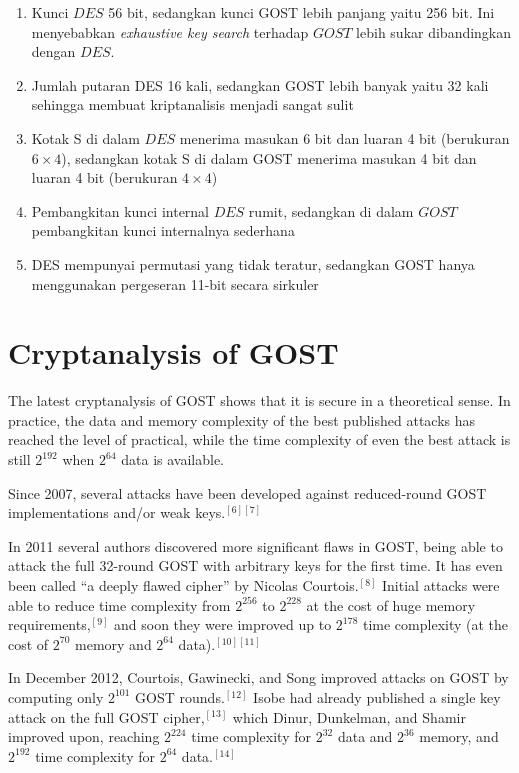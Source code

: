 \documentclass{article}
\begin{document}
\begin{enumerate}
    \item Kunci $DES$ 56 bit, sedangkan kunci GOST lebih panjang yaitu 256 bit. Ini menyebabkan \textit{exhaustive key search} terhadap $GOST$ lebih sukar dibandingkan dengan $DES$.
    \item Jumlah putaran DES 16 kali, sedangkan GOST lebih banyak yaitu 32 kali sehingga membuat kriptanalisis menjadi sangat sulit
    \item Kotak S di dalam $DES$ menerima masukan 6 bit dan luaran 4 bit (berukuran $6 \times 4$), sedangkan kotak S di dalam GOST menerima masukan 4 bit dan luaran 4 bit (berukuran $4 \times 4$)
    \item Pembangkitan kunci internal $DES$ rumit, sedangkan di dalam $GOST$ pembangkitan kunci internalnya sederhana
    \item DES mempunyai permutasi yang tidak teratur, sedangkan GOST hanya menggunakan pergeseran 11-bit secara sirkuler
\end{enumerate}

\newpage


\section*{Cryptanalysis of GOST}

The latest cryptanalysis of GOST shows that it is secure in a theoretical sense. In practice, the data and memory complexity of the best published attacks has reached the level of practical, while the time complexity of even the best attack is still $2^{192}$ when $2^{64}$ data is available.

Since 2007, several attacks have been developed against reduced-round GOST implementations and/or weak keys.$^{[6][7]}$

In 2011 several authors discovered more significant flaws in GOST, being able to attack the full 32-round GOST with arbitrary keys for the first time. It has even been called ``a deeply flawed cipher'' by Nicolas Courtois.$^{[8]}$ Initial attacks were able to reduce time complexity from $2^{256}$ to $2^{228}$ at the cost of huge memory requirements,$^{[9]}$ and soon they were improved up to $2^{178}$ time complexity (at the cost of $2^{70}$ memory and $2^{64}$ data).$^{[10][11]}$

In December 2012, Courtois, Gawinecki, and Song improved attacks on GOST by computing only $2^{101}$ GOST rounds.$^{[12]}$ Isobe had already published a single key attack on the full GOST cipher,$^{[13]}$ which Dinur, Dunkelman, and Shamir improved upon, reaching $2^{224}$ time complexity for $2^{32}$ data and $2^{36}$ memory, and $2^{192}$ time complexity for $2^{64}$ data.$^{[14]}$
\end{document}
